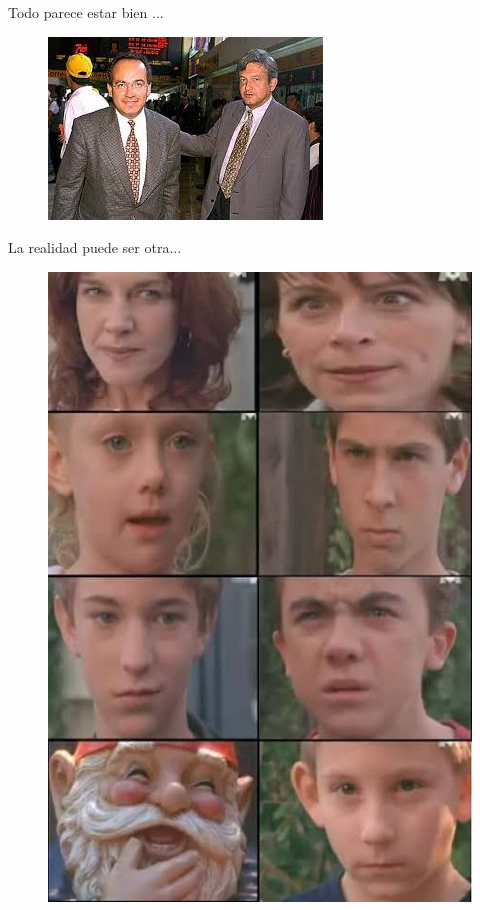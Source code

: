 \documentclass[11pt]{beamer}
\begin{document}
\begin{frame}{Todo parece estar bien ... }
	\begin{figure}
		\includegraphics[scale=0.8]{images/armonia_cuatro	}
	\end{figure}
\end{frame}

\begin{frame}{La realidad puede ser otra...}
	\begin{figure}
		\includegraphics[scale=0.3]{images/realidad}
	\end{figure}
\end{frame}
\end{document}
